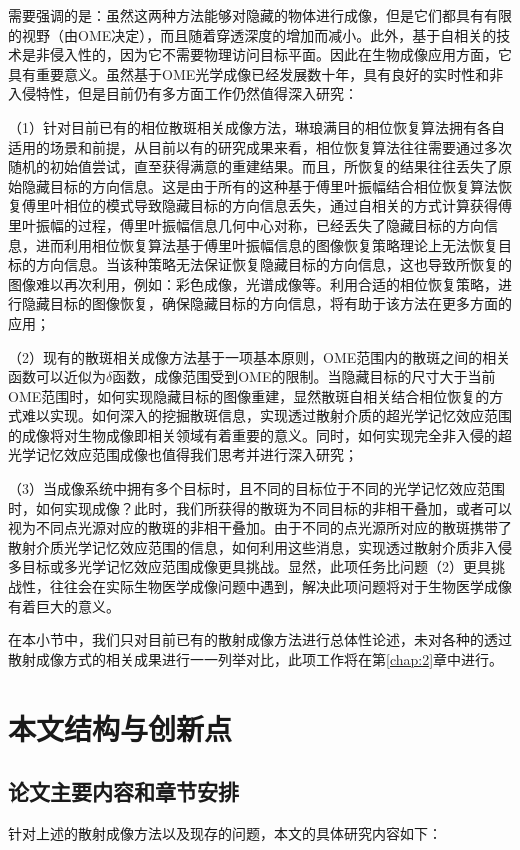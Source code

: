 需要强调的是：虽然这两种方法\cite{bertolotti_non-invasive_2012,katz_non-invasive_2014}能够对隐藏的物体进行成像，但是它们都具有有限的视野（由OME决定），而且随着穿透深度的增加而减小。此外，基于自相关的技术是非侵入性的，因为它不需要物理访问目标平面。因此在生物成像应用方面，它具有重要意义。虽然基于OME光学成像已经发展数十年，具有良好的实时性和非入侵特性，但是目前仍有多方面工作仍然值得深入研究：

（1）针对目前已有的相位散斑相关成像方法，琳琅满目的相位恢复算法拥有各自适用的场景和前提，从目前以有的研究成果来看，相位恢复算法往往需要通过多次随机的初始值尝试，直至获得满意的重建结果。而且，所恢复的结果往往丢失了原始隐藏目标的方向信息。这是由于所有的这种基于傅里叶振幅结合相位恢复算法恢复傅里叶相位的模式导致隐藏目标的方向信息丢失，通过自相关的方式计算获得傅里叶振幅的过程，傅里叶振幅信息几何中心对称，已经丢失了隐藏目标的方向信息，进而利用相位恢复算法基于傅里叶振幅信息的图像恢复策略理论上无法恢复目标的方向信息。当该种策略无法保证恢复隐藏目标的方向信息，这也导致所恢复的图像难以再次利用，例如：彩色成像，光谱成像等。利用合适的相位恢复策略，进行隐藏目标的图像恢复，确保隐藏目标的方向信息，将有助于该方法在更多方面的应用；

（2）现有的散斑相关成像方法基于一项基本原则，OME范围内的散斑之间的相关函数可以近似为$\delta$函数，成像范围受到OME的限制。当隐藏目标的尺寸大于当前OME范围时，如何实现隐藏目标的图像重建，显然散斑自相关结合相位恢复的方式难以实现。如何深入的挖掘散斑信息，实现透过散射介质的超光学记忆效应范围的成像将对生物成像即相关领域有着重要的意义。同时，如何实现完全非入侵的超光学记忆效应范围成像也值得我们思考并进行深入研究；

（3）当成像系统中拥有多个目标时，且不同的目标位于不同的光学记忆效应范围时，如何实现成像？此时，我们所获得的散斑为不同目标的非相干叠加，或者可以视为不同点光源对应的散斑的非相干叠加。由于不同的点光源所对应的散斑携带了散射介质光学记忆效应范围的信息，如何利用这些消息，实现透过散射介质非入侵多目标或多光学记忆效应范围成像更具挑战。显然，此项任务比问题（2）更具挑战性，往往会在实际生物医学成像问题中遇到，解决此项问题将对于生物医学成像有着巨大的意义。

在本小节中，我们只对目前已有的散射成像方法进行总体性论述，未对各种的透过散射成像方式的相关成果进行一一列举对比，此项工作将在第\ref{chap:2}章中进行。

\section{本文结构与创新点}

\subsection{论文主要内容和章节安排}
针对上述的散射成像方法以及现存的问题，本文的具体研究内容如下：

